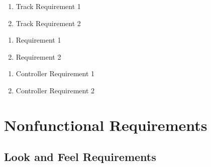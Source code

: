 \documentclass [12pt]{article}
\begin{document}
\begin{enumerate}
	\setlength{\itemindent}{.2in}
	\itemsep0pt 
	\item Track Requirement 1
	\item Track Requirement 2

\end{enumerate}


\begin{enumerate}
	\setlength{\itemindent}{.2in}
	\itemsep0pt 
	\item Requirement 1
	\item Requirement 2

\end{enumerate}


\begin{enumerate}
	\setlength{\itemindent}{.2in}
	\itemsep0pt 
	\item Controller Requirement 1
	\item Controller Requirement 2

\end{enumerate}




%
%



\section {Nonfunctional Requirements} 



\subsection {Look and Feel Requirements}
\end{document}
